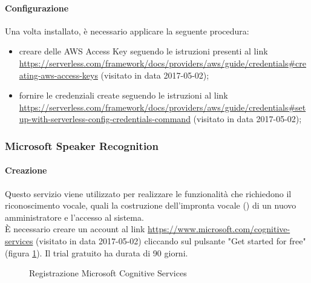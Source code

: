 \paragraph{Configurazione}
Una volta installato, è necessario applicare la seguente procedura:
\begin{itemize}
	\item creare delle AWS Access Key seguendo le istruzioni presenti al link \url{https://serverless.com/framework/docs/providers/aws/guide/credentials#creating-aws-access-keys} (visitato in data 2017-05-02);
	\item fornire le credenziali create seguendo le istruzioni al link \url{https://serverless.com/framework/docs/providers/aws/guide/credentials#setup-with-serverless-config-credentials-command} (visitato in data 2017-05-02);
\end{itemize}

\subsubsection{Microsoft Speaker Recognition}\label{speakerRec}
\paragraph{Creazione}
Questo servizio viene utilizzato per realizzare le funzionalità che richiedono il riconoscimento vocale, quali la costruzione dell'impronta vocale () di un nuovo amministratore e l'accesso al sistema.\\
È necessario creare un account al link \url{https://www.microsoft.com/cognitive-services} (visitato in data 2017-05-02) cliccando sul pulsante "Get started for free" (figura \ref{fig:microsoft}). Il trial gratuito ha durata di 90 giorni.
\begin{figure}[h]
	\caption{Registrazione Microsoft Cognitive Services}\label{fig:microsoft}
\end{figure}
